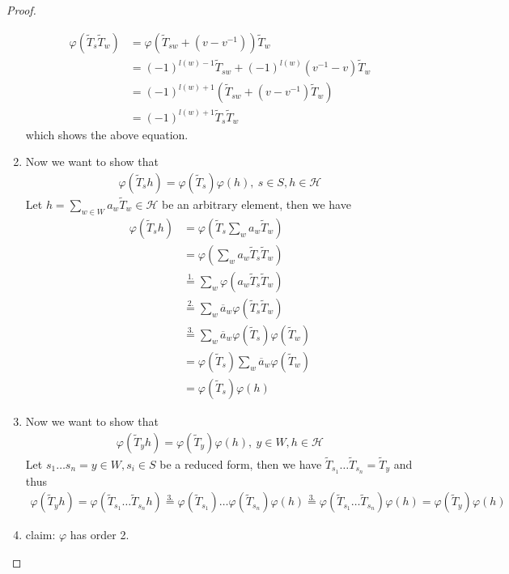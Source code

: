 \documentclass[]{article}
\begin{document}
\begin{proof}
\begin{enumerate}
        \begin{align*}
            \varphi(\widetilde{T}_s \widetilde{T}_w) &= \varphi(\widetilde{T}_{sw}+(v-v^{-1}))\widetilde{T}_w \\
            &=(-1)^{l(w)-1} \widetilde{T}_{sw} + (-1)^{l(w)}(v^{-1}-v)\widetilde{T}_w \\
            &=(-1)^{l(w)+1} (\widetilde{T}_{sw} + (v- v^{-1}) \widetilde{T}_w) \\
            &=(-1)^{l(w)+1} \widetilde{T}_s \widetilde{T}_w
        \end{align*}
        which shows the above equation. 
        \item Now we want to show that
        \begin{align*}
            \varphi(\widetilde{T}_s h) = \varphi(\widetilde{T}_s) \varphi(h), \ s \in S, h \in \mathscr{H}
        \end{align*}
        Let \(h = \sum_{w \in W}^{}a_w \widetilde{T}_w \in \mathscr{H}\) be an arbitrary element, then we have 
        \begin{align*}
            \varphi(\widetilde{T}_s h) &= \varphi\left(\widetilde{T}_s \sum_{w}^{} a_w \widetilde{T}_w\right) \\
            &=\varphi\left( \sum_{w}^{} a_w \widetilde{T}_s\widetilde{T}_w\right) \\
            &\overset{1.}{=} \sum_{w}^{} \varphi(a_w \widetilde{T}_s\widetilde{T}_w) \\
            &\overset{2.}{=} \sum_{w}^{} \overline{a}_w \varphi(\widetilde{T}_s\widetilde{T}_w) \\
            &\overset{3.}{=} \sum_{w}^{} \overline{a}_w \varphi(\widetilde{T}_s)\varphi(\widetilde{T}_w) \\
            &=\varphi(\widetilde{T}_s) \sum_{w}^{} \overline{a}_w \varphi(\widetilde{T}_w) \\
            &= \varphi(\widetilde{T}_s) \varphi(h)
        \end{align*}
        \item Now we want to show that
        \begin{align*}
            \varphi(\widetilde{T}_y h) = \varphi(\widetilde{T}_y) \varphi(h), \ y \in W, h \in \mathscr{H}
        \end{align*}
        Let \(s_1 \dots s_n = y \in W, s_i \in S\) be a reduced form, then we have \(\widetilde{T}_{s_1}\dots \widetilde{T}_{s_n} = \widetilde{T}_y\) and thus
        \begin{align*}
            \varphi(\widetilde{T}_y h) = \varphi(\widetilde{T}_{s_1}\dots \widetilde{T}_{s_n}h) \overset{3.}{=} \varphi(\widetilde{T}_{s_1})\dots \varphi(\widetilde{T}_{s_n})\varphi(h) \overset{3.}{=} \varphi(\widetilde{T}_{s_1}\dots \widetilde{T}_{s_n}) \varphi(h ) = \varphi(\widetilde{T}_y) \varphi(h)
        \end{align*}
        \item claim: \(\varphi\) has order 2.


\end{enumerate}
\end{proof}
\end{document}
